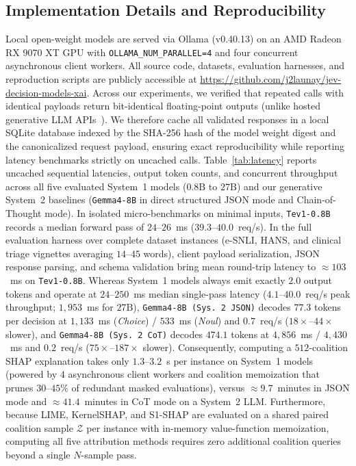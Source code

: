 \documentclass[10pt]{article}
\begin{document}
\subsection{Implementation Details and Reproducibility}
Local open-weight models are served via Ollama (v0.40.13) on an AMD Radeon RX 9070 XT GPU with \texttt{OLLAMA\_NUM\_PARALLEL=4} and four concurrent asynchronous client workers.
All source code, datasets, evaluation harnesses, and reproduction scripts are publicly accessible at \url{https://github.com/j2launay/jev-decision-models-xai}.
Across our experiments, we verified that repeated calls with identical payloads return bit-identical floating-point outputs (unlike hosted generative LLM APIs~\cite{atil2025nondeterminism}).
We therefore cache all validated responses in a local SQLite database indexed by the SHA-256 hash of the model weight digest and the canonicalized request payload, ensuring exact reproducibility while reporting latency benchmarks strictly on uncached calls.
Table~\ref{tab:latency} reports uncached sequential latencies, output token counts, and concurrent throughput across all five evaluated System~1 models ($0.8\text{B}$ to $27\text{B}$) and our generative System~2 baselines (\texttt{Gemma4-8B} in direct structured JSON mode and Chain-of-Thought mode).
In isolated micro-benchmarks on minimal inputs, \texttt{Tev1-0.8B} records a median forward pass of $24$--$26$~ms ($39.3$--$40.0$~req/s).
In the full evaluation harness over complete dataset instances (e-SNLI, HANS, and clinical triage vignettes averaging $14$--$45$ words), client payload serialization, JSON response parsing, and schema validation bring mean round-trip latency to $\approx 103$~ms on \texttt{Tev1-0.8B}.
Whereas System~1 models always emit exactly $2.0$ output tokens and operate at $24$--$250$~ms median single-pass latency ($4.1$--$40.0$~req/s peak throughput; $1{,}953$~ms for $27\text{B}$), \texttt{Gemma4-8B (Sys.\,2 JSON)} decodes $77.3$ tokens per decision at $1{,}133$~ms (\emph{Choice}) / $533$~ms (\emph{Noul}) and $0.7$~req/s ($18\times$--$44\times$ slower), and \texttt{Gemma4-8B (Sys.\,2 CoT)} decodes $474.1$ tokens at $4{,}856$~ms / $4{,}430$~ms and $0.2$~req/s ($75\times$--$187\times$ slower).
Consequently, computing a $512$-coalition SHAP explanation takes only $1.3$--$3.2$~s per instance on System~1 models (powered by $4$ asynchronous client workers and coalition memoization that prunes $30$--$45\%$ of redundant masked evaluations), versus $\approx 9.7$~minutes in JSON mode and $\approx 41.4$~minutes in CoT mode on a System~2 LLM.
Furthermore, because LIME, KernelSHAP, and S1-SHAP are evaluated on a shared paired coalition sample $\mathcal{Z}$ per instance with in-memory value-function memoization, computing all five attribution methods requires zero additional coalition queries beyond a single $N$-sample pass.
\end{document}
